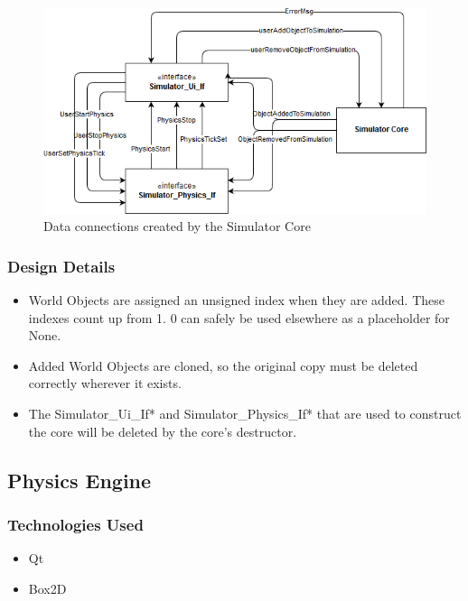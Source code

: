  \begin{figure}[h]
 	\begin{center}
 	\includegraphics[scale=0.5]{./images_design/uml/DataFlow_simcore}
 	\caption{Data connections created by the Simulator Core\label{uml:dataflow_simcore}}
 	\end{center}
 \end{figure} 

\subsubsection*{Design Details}
\begin{itemize}
	\item World Objects are assigned an unsigned index when they are added. These indexes count up from 1. 0 can safely be used elsewhere as a placeholder for None.
	\item Added World Objects are cloned, so the original copy must be deleted correctly wherever it exists.
	\item The Simulator\_Ui\_If* and Simulator\_Physics\_If* that are used to construct the core will be deleted by the core's destructor.
\end{itemize}

\subsection{Physics Engine}

\subsubsection*{Technologies  Used}
\begin{itemize}
	\item Qt
	\item Box2D
\end{itemize}

